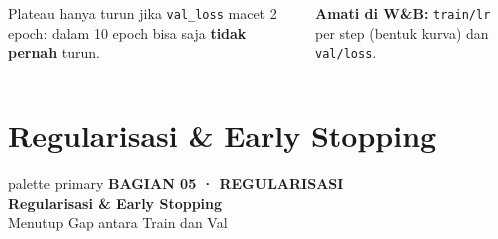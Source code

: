 \documentclass[t,aspectratio=169,xcolor={dvipsnames,table}]{beamer}
\newcommand{\bagian}[3]{%
\begin{frame}[plain]
  \begin{beamercolorbox}[wd=\paperwidth,ht=\paperheight,sep=1.5cm]{palette primary}
    \vspace{1.5cm}
    {\scriptsize\bfseries\color{dlMute}#1}\\[0.4cm]
    {\Huge\bfseries #2}\\[0.4cm]
    {\small\color{dlHairline}#3}
    \vfill
  \end{beamercolorbox}
\end{frame}}
\begin{document}
\begin{frame}
\begin{columns}[T]
        \vspace{0.12cm}
        {\scriptsize Plateau hanya turun jika \texttt{val\_loss} macet 2 epoch: dalam 10 epoch bisa saja \textbf{tidak pernah} turun.}

        \vspace{0.1cm}
        {\scriptsize\color{dlMute} \textbf{Amati di W\&B:} \texttt{train/lr} per step (bentuk kurva) dan \texttt{val/loss}.}
    \end{columns}
\end{frame}

\section{Regularisasi \& Early Stopping}
\bagian{BAGIAN 05 · REGULARISASI}{Regularisasi \& Early Stopping}{Menutup Gap antara Train dan Val}
\end{document}
